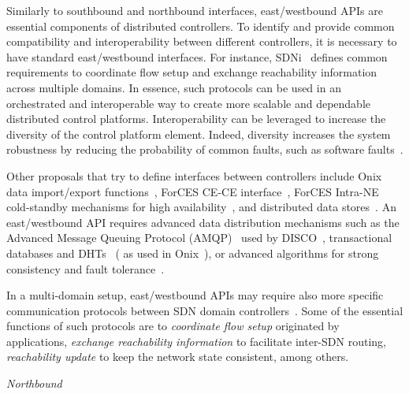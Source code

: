 Similarly to southbound and northbound interfaces, east/westbound APIs are essential components of 
distributed controllers. 
To identify and provide common compatibility and interoperability between 
different controllers, it is necessary to have standard east/westbound interfaces. 
For instance, SDNi~\cite{yin2012} defines 
common requirements to coordinate flow setup and exchange reachability information across multiple 
domains. 
In essence, such protocols can be used in an orchestrated and interoperable 
way to create more scalable and dependable distributed control platforms. Interoperability can be 
leveraged to increase the diversity of the control platform element. Indeed, diversity increases the 
system robustness by reducing the probability of common faults, such as software faults~\cite{garcia2013}.

Other proposals that try to define interfaces between controllers include Onix data import/export functions~\cite{koponen-1}, ForCES CE-CE interface~\cite{doria2010,wang2011-1}, 
ForCES Intra-NE cold-standby mechanisms for high availability~\cite{ogawa2013}, and distributed data stores~\cite{botelho2013}. 
An east/westbound API requires advanced data distribution mechanisms such as the Advanced Message Queuing Protocol  (AMQP)~\cite{vinoski2006} used by
DISCO~\cite{phemius2013}, transactional databases and DHTs~\cite{ghodsi2006} ( as used in Onix~\cite{koponen-1}), or advanced algorithms for strong consistency and fault 
tolerance~\cite{botelho2013}.

In a multi-domain setup, east/westbound APIs may require also more specific communication protocols 
between SDN domain controllers~\cite{stallings2013}. Some of the essential functions of such 
protocols are to \textit{coordinate flow setup} originated by applications, \textit{exchange reachability 
information} to facilitate inter-SDN routing, \textit{reachability update} to keep the network state 
consistent, among others.

\vspace{2mm}
\noindent \textit{Northbound}

